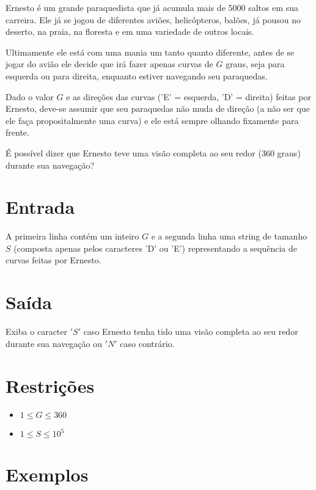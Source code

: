 Ernesto é um grande paraquedista que já acumula mais de 5000 saltos em sua carreira. Ele já se jogou de diferentes aviões, helicópteros, balões, já pousou no deserto, na praia, na floresta e em uma variedade de outros locais.

Ultimamente ele está com uma mania um tanto quanto diferente, antes de se jogar do avião ele decide que irá fazer apenas curvas de $G$ graus, seja para esquerda ou para direita, enquanto estiver navegando seu paraquedas.

Dado o valor $G$ e as direções das curvas ('E' = esquerda, 'D' = direita) feitas por Ernesto, deve-se assumir que seu paraquedas não muda de direção (a não ser que ele faça propositalmente uma curva) e ele está sempre olhando fixamente para frente.

É possível dizer que Ernesto teve uma visão completa ao seu redor (360 graus) durante sua navegação?

\section*{Entrada}

A primeira linha contém um inteiro $G$ e a segunda linha uma string de tamanho $S$ (composta apenas pelos caracteres 'D' ou 'E') representando a sequência de curvas feitas por Ernesto.

\section*{Saída}

Exiba o caracter $'S'$ caso Ernesto tenha tido uma visão completa ao seu redor durante sua navegação ou $'N'$ caso contrário.

\section*{Restrições}

\begin{itemize}
\item $1 \leq G \leq 360$
\item $1 \leq S \leq 10^5$
\end{itemize}

\section*{Exemplos}

\exemplo
